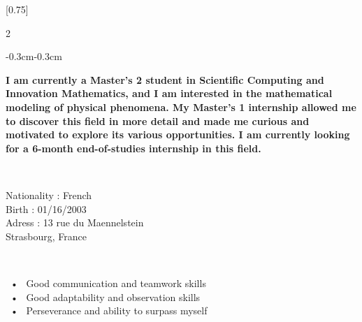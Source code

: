 \documentclass[lighthipster]{latex_for_CV/simplehipstercv}
\begin{document}
\setlength{\columnsep}{1.5cm}
[0.75]
\begin{paracol}{2}

\paracolbackgroundoptions



\footnotesize
{\setasidefontcolour
\begin{center}
\end{center}

\vspace{-0.8cm}
\begin{adjustwidth}{-0.3cm}{-0.3cm}
\begin{flushright}
{\textbf{\color{gray!130} I am currently a Master's 2 student in Scientific Computing and Innovation Mathematics, and I am interested in the mathematical modeling of physical phenomena. My Master's 1 internship allowed me to discover this field in more detail and made me curious and motivated to explore its various opportunities. I am currently looking for a 6-month end-of-studies internship in this field.}}
\end{flushright}
\end{adjustwidth}

\bigskip

\flushright
{} \\[0.5em]
\vspace{0.5em}

Nationality : French  \\
Birth : 01/16/2003 \\
Adress : 13 rue du Maennelstein \\ Strasbourg, France


\bigskip
\bigskip
\bigskip


 \\[0.5em]
\vspace{0.5em}

~•~ Good communication and teamwork skills \\
~•~ Good adaptability and observation skills \\
~•~ Perseverance and ability to surpass myself

\bigskip
\bigskip
\bigskip


\\[0.5em]
\vspace{0.5em}

}
\end{paracol}
\end{document}
